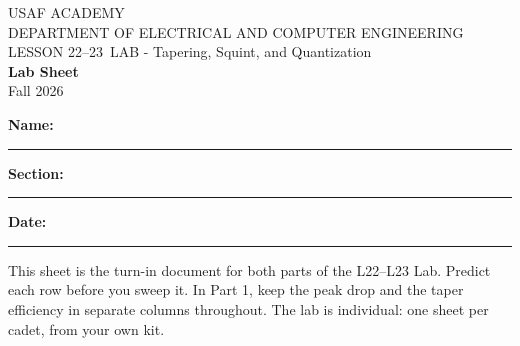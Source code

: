 \documentclass{exam}
\def\labLesson{22--23}
\def\thisterm{\thisTermIn}
\def\thisterm{Fall 2026}
\begin{document}
\pagestyle{headandfoot}   %



\begin{center}
USAF ACADEMY \\
DEPARTMENT OF ELECTRICAL AND COMPUTER ENGINEERING \\
LESSON \labLesson\ LAB - Tapering, Squint, and Quantization \\
\textbf{Lab Sheet} \\
\thisterm \\[4mm]
\end{center}

\vspace{-4pt}
\textbf{Name:} \rule[-2pt]{2.6in}{0.4pt} \hfill
\textbf{Section:} \rule[-2pt]{0.9in}{0.4pt} \hfill
\textbf{Date:} \rule[-2pt]{1.1in}{0.4pt}

\vspace{4pt}


\vspace{2pt}

This sheet is the turn-in document for both parts of the L22--L23 Lab. Predict
each row before you sweep it. In Part 1, keep the peak drop and the taper
efficiency in separate columns throughout. The lab is individual: one sheet per
cadet, from your own kit.
\end{document}
